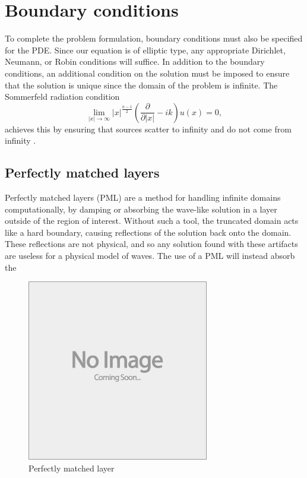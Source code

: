 
\section{Boundary conditions}

To complete the problem formulation, boundary conditions must also be specified for the PDE.
Since our equation is of elliptic type, any appropriate Dirichlet, Neumann, or Robin conditions will suffice.
In addition to the boundary conditions, an additional condition on the solution must be imposed to ensure that the solution is unique since the domain of the problem is infinite.
The Sommerfeld radiation condition
\[
\lim_{|x|\rightarrow \infty} |x|^{\frac{n-1}{2}} \left( \frac{\partial}{\partial |x|} - ik \right) u(x) = 0,
\]
achieves this by ensuring that sources scatter to infinity and do not come from infinity \cite{sommerfeld}.




\subsection{Perfectly matched layers}

Perfectly matched layers (PML) are a method for handling infinite domains computationally, by damping or absorbing the wave-like solution in a layer outside of the region of interest.
Without such a tool, the truncated domain acts like a hard boundary, causing reflections of the solution back onto the domain.
These reflections are not physical, and so any solution found with these artifacts are useless for a physical model of waves.
The use of a PML will instead absorb the 


\begin{figure}[h]
	\centering
	\includegraphics[draft]{images/placeholder}
	\caption{Perfectly matched layer \label{fig:pml}}
\end{figure}

